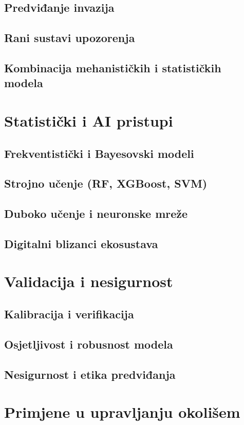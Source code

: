 \documentclass[12pt,a4paper]{book}
\begin{document}
	\section{Predviđanje invazija}
	\section{Rani sustavi upozorenja}
	\section{Kombinacija mehanističkih i statističkih modela}
	
	\chapter{Statistički i AI pristupi}
	\section{Frekventistički i Bayesovski modeli}
	\section{Strojno učenje (RF, XGBoost, SVM)}
	\section{Duboko učenje i neuronske mreže}
	\section{Digitalni blizanci ekosustava}
	
	\chapter{Validacija i nesigurnost}
	\section{Kalibracija i verifikacija}
	\section{Osjetljivost i robusnost modela}
	\section{Nesigurnost i etika predviđanja}
	
	\chapter{Primjene u upravljanju okolišem}
\end{document}
